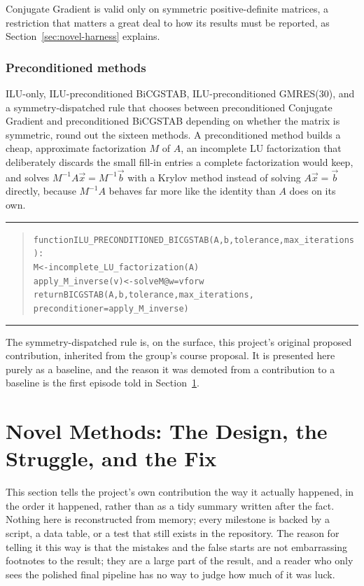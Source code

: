\documentclass[11pt,a4paper]{article}
\newenvironment{pseudobox}
  {\begin{center}\color{SBgold}\rule{0.92\linewidth}{0.8pt}\end{center}\vspace{-2pt}
   \begin{quote}\small\color{SBnavy}
   \begin{alltt}\ttfamily}
  {\end{alltt}\end{quote}\vspace{-6pt}\begin{center}\color{SBgold}\rule{0.92\linewidth}{0.8pt}\end{center}}
\begin{document}
Conjugate Gradient is valid only on symmetric positive-definite matrices, a restriction
that matters a great deal to how its results must be reported, as
Section~\ref{sec:novel-harness} explains.

\subsubsection{Preconditioned methods}
\label{sec:methods-precond}

ILU-only, ILU-preconditioned BiCGSTAB, ILU-preconditioned GMRES(30), and a
symmetry-dispatched rule that chooses between preconditioned Conjugate Gradient and
preconditioned BiCGSTAB depending on whether the matrix is symmetric, round out the
sixteen methods. A preconditioned method builds a cheap, approximate factorization $M$ of
$A$, an incomplete LU factorization that deliberately discards the small fill-in entries a
complete factorization would keep, and solves $M^{-1}A\vec{x}=M^{-1}\vec{b}$ with a Krylov
method instead of solving $A\vec{x}=\vec{b}$ directly, because $M^{-1}A$ behaves far more
like the identity than $A$ does on its own.

\begin{pseudobox}
function ILU_PRECONDITIONED_BICGSTAB(A, b, tolerance, max_iterations):
    M <- incomplete_LU_factorization(A)
    apply_M_inverse(v) <- solve M @ w = v for w
    return BICGSTAB(A, b, tolerance, max_iterations,
                     preconditioner = apply_M_inverse)
\end{pseudobox}

The symmetry-dispatched rule is, on the surface, this project's original proposed
contribution, inherited from the group's course proposal. It is presented here purely as
a baseline, and the reason it was demoted from a contribution to a baseline is the first
episode told in Section~\ref{sec:novel}.

\clearpage
\section{Novel Methods: The Design, the Struggle, and the Fix}
\label{sec:novel}

This section tells the project's own contribution the way it actually happened, in the
order it happened, rather than as a tidy summary written after the fact. Nothing here is
reconstructed from memory; every milestone is backed by a script, a data table, or a test
that still exists in the repository. The reason for telling it this way is that the
mistakes and the false starts are not embarrassing footnotes to the result; they are a
large part of the result, and a reader who only sees the polished final pipeline has no
way to judge how much of it was luck.
\end{document}
